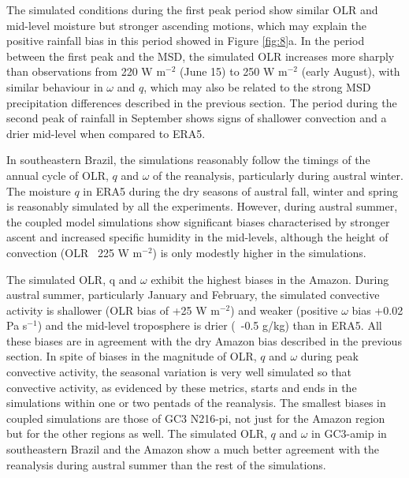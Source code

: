 The simulated conditions during the first peak period show similar OLR and mid-level moisture but stronger ascending motions, which may explain the positive rainfall bias in this period showed in Figure \ref{fig:8}a.
In the period between the first peak and the MSD, the simulated OLR increases more sharply than observations from 220 W m$^{-2}$ (June 15) to 250 W m$^{-2}$ (early August), with similar behaviour in $\omega$ and $q$, which may also be related to the strong MSD precipitation differences described in the previous section.
The period during the second peak of rainfall in September shows signs of shallower convection and a drier mid-level when compared to ERA5.

In southeastern Brazil, the simulations reasonably follow the timings of the annual cycle of OLR, $q$ and $\omega$ of the reanalysis, particularly during austral winter. The moisture $q$ in ERA5 during  the dry seasons of austral fall, winter and spring is reasonably simulated by all the experiments. However, during austral summer, the coupled model simulations show significant biases characterised by stronger ascent and increased specific humidity in the mid-levels, although the height of convection (OLR~ 225 W m$^{-2}$) is only modestly higher in the simulations.

The simulated OLR, q and $\omega$ exhibit the highest biases in the Amazon. During austral summer, particularly January and February, the simulated convective activity is shallower (OLR bias of +25 W m$^{-2}$) and weaker (positive $\omega$ bias +0.02 Pa s$^{-1}$) and the mid-level troposphere is drier (~-0.5 g/kg) than in ERA5. All these biases are in agreement with the dry Amazon bias described in the previous section. In spite of biases in the magnitude of OLR, $q$ and $\omega$ during peak convective activity, the seasonal variation is very well simulated so that convective activity, as evidenced by these metrics, starts and ends in the simulations within one or two pentads of the reanalysis. The smallest biases in coupled simulations are those of GC3 N216-pi, not just for the Amazon region but for the other regions as well.  The simulated OLR, $q$ and $\omega$ in GC3-amip in southeastern Brazil and the Amazon show a much better agreement with the reanalysis during austral summer than the rest of the simulations.


